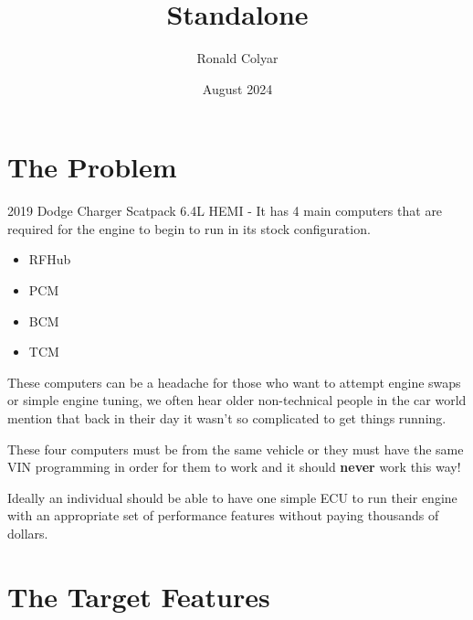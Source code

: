 \documentclass{article}
\title{Standalone}
\author{Ronald Colyar}
\date{August 2024}
\begin{document}
\maketitle

\section{The Problem}
2019 Dodge Charger Scatpack 6.4L HEMI - It has 4 main computers that are required for the engine to begin to run in its stock configuration.

\begin{itemize}
    \item RFHub
    \item PCM
    \item BCM
    \item TCM
\end{itemize}
These computers can be a headache for those who want to attempt engine swaps or simple engine tuning, we often hear older non-technical people in the car world mention that back in their day it wasn't so complicated to get things running.
\vspace{0.5cm}

\noindent
These four computers must be from the same vehicle or they must have the same VIN programming in order for them to work and it should \textbf{never} work this way!
\vspace{0.5cm}

\noindent
Ideally an individual should be able to have one simple ECU to run their engine with an appropriate set of performance features without paying thousands of dollars.

\newpage
\section{The Target Features}
\end{document}
